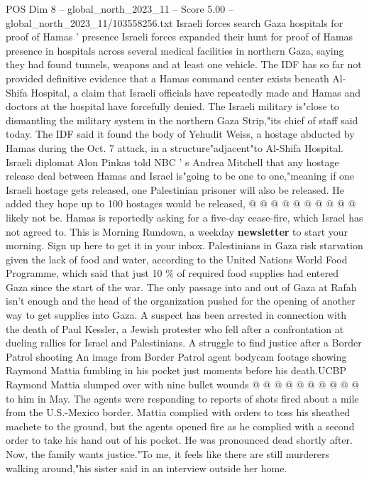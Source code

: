 \begin{textsample}{POS Dim 8 – global\_north\_2023\_11 – Score 5.00 – global\_north\_2023\_11/103558256.txt}  \label{ex:f8_pos_183}
Israeli forces search Gaza hospitals for proof of Hamas ' presence Israeli forces expanded their hunt for proof of Hamas presence in hospitals across several medical facilities in northern Gaza, saying they had found tunnels, weapons and at least one vehicle.
The IDF has so far not provided definitive evidence that a Hamas command center exists beneath Al-Shifa Hospital, a claim that Israeli officials have repeatedly made and Hamas and doctors at the hospital have forcefully denied.
The Israeli military is"close to dismantling the military system in the northern Gaza Strip,"its chief of staff said today.
The IDF said it found the body of Yehudit Weiss, a hostage abducted by Hamas during the Oct. 7 attack, in a structure"adjacent"to Al-Shifa Hospital.
Israeli diplomat Alon Pinkas told NBC ' s Andrea Mitchell that any hostage release deal between Hamas and Israel is"going to be one to one,"meaning if one Israeli hostage gets released, one Palestinian prisoner will also be released.
He added they hope up to 100 hostages would be released, @ @ @ @ @ @ @ @ @ @ likely not be.
Hamas is reportedly asking for a five-day cease-fire, which Israel has not agreed to.
This is Morning Rundown, a weekday \textbf{newsletter} to start your morning.
Sign up here to get it in your inbox.
Palestinians in Gaza risk starvation given the lack of food and water, according to the United Nations World Food Programme, which said that just 10 \% of required food supplies had entered Gaza since the start of the war.
The only passage into and out of Gaza at Rafah isn't enough and the head of the organization pushed for the opening of another way to get supplies into Gaza.
A suspect has been arrested in connection with the death of Paul Kessler, a Jewish protester who fell after a confrontation at dueling rallies for Israel and Palestinians.
A struggle to find justice after a Border Patrol shooting An image from Border Patrol agent bodycam footage showing Raymond Mattia fumbling in his pocket just moments before his death.UCBP Raymond Mattia slumped over with nine bullet wounds @ @ @ @ @ @ @ @ @ @ to him in May.
The agents were responding to reports of shots fired about a mile from the U.S.-Mexico border.
Mattia complied with orders to toss his sheathed machete to the ground, but the agents opened fire as he complied with a second order to take his hand out of his pocket.
He was pronounced dead shortly after.
Now, the family wants justice."To me, it feels like there are still murderers walking around,"his sister said in an interview outside her home.

\end{textsample}
